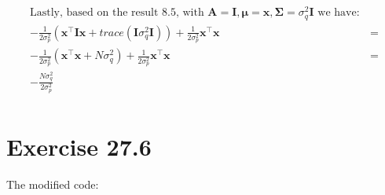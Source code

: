 \documentclass[11pt,a4paper,oneside]{report}
\begin{document}
\begin{align*}
\text{Lastly, based on the result 8.5, with }\mathbf{A}=\mathbf{I},\mathbf{\mu}=\mathbf{x},\mathbf{\Sigma}=\sigma_q^2\mathbf{I} \text{ we have}:&\\
-\frac{1}{2\sigma_p^2} \left( \mathbf{x}^\top\mathbf{I}\mathbf{x}+ trace(\mathbf{I}\sigma_q^2\mathbf{I}) \right)+ \frac{1}{2\sigma_p^2}\mathbf{x}^\top\mathbf{x} &=\\
-\frac{1}{2\sigma_p^2} \left( \mathbf{x}^\top\mathbf{x}+ N\sigma_q^2 \right)+ \frac{1}{2\sigma_p^2}\mathbf{x}^\top\mathbf{x} &=\\
-\frac{N\sigma_q^2}{2\sigma_p^2} &\\
\end{align*}



\section*{Exercise 27.6}

The modified code:
\end{document}
